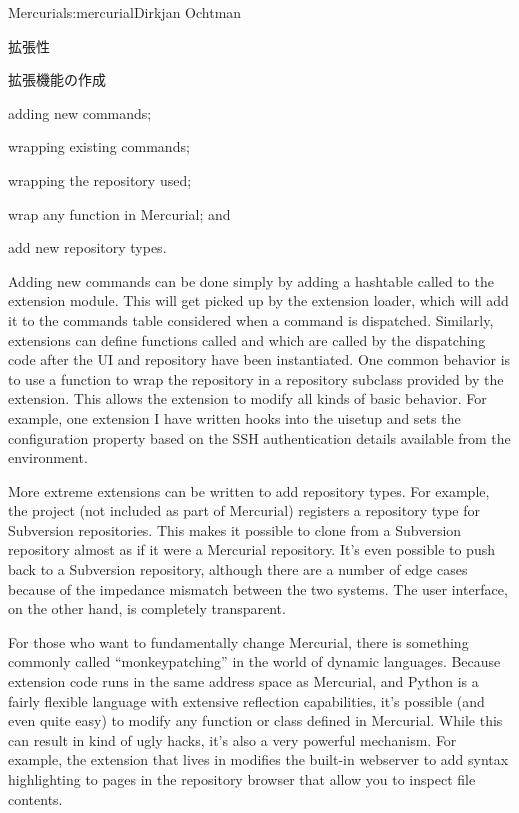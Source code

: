 \begin{aosachapter}{Mercurial}{s:mercurial}{Dirkjan Ochtman}
\begin{aosasect1}{拡張性}
\begin{aosasect2}{拡張機能の作成}
\begin{aosaitemize}

  \item adding new commands;

  \item wrapping existing commands;

  \item wrapping the repository used;

  \item wrap any function in Mercurial; and

  \item add new repository types.

\end{aosaitemize}

Adding new commands can be done simply by adding a hashtable called
 to the extension module. This will get picked up by
the extension loader, which will add it to the commands table
considered when a command is dispatched. Similarly, extensions can
define functions called  and  which are
called by the dispatching code after the UI and repository have been
instantiated. One common behavior is to use a 
function to wrap the repository in a repository subclass provided by
the extension. This allows the extension to modify all kinds of basic
behavior. For example, one extension I have written hooks into the
uisetup and sets the  configuration property based on the
SSH authentication details available from the environment.

More extreme extensions can be written to add repository types. For
example, the  project (not included as part of
Mercurial) registers a repository type for Subversion
repositories. This makes it possible to clone from a Subversion
repository almost as if it were a Mercurial repository. It's even
possible to push back to a Subversion repository, although there are a
number of edge cases because of the impedance mismatch between the two
systems. The user interface, on the other hand, is completely
transparent.

For those who want to fundamentally change Mercurial, there is
something commonly called ``monkeypatching'' in the world of dynamic
languages. Because extension code runs in the same address space as
Mercurial, and Python is a fairly flexible language with extensive
reflection capabilities, it's possible (and even quite easy) to modify
any function or class defined in Mercurial. While this can result in
kind of ugly hacks, it's also a very powerful mechanism. For example,
the  extension that lives in  modifies the
built-in webserver to add syntax highlighting to pages in the
repository browser that allow you to inspect file contents.


\end{aosasect2}
\end{aosasect1}
\end{aosachapter}
